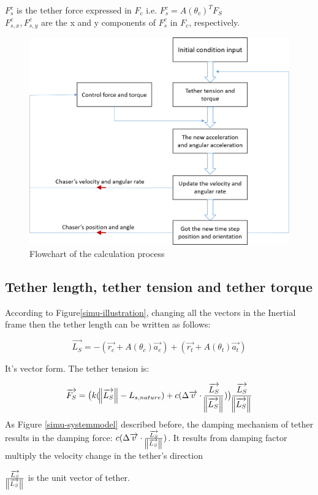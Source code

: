 \quad $F_{s}^c$ is the tether force expressed in $F_c$ i.e. $F_{s}^c = A(\theta_c)^TF_S$\\
\quad $F_{s,x}^c,F_{s,y}^c$ are the x and y components of $F_{s}^c$ in $F_c$, respectively.

\begin{figure}
\centering
\includegraphics[width=\textwidth]{fig/simulation/flowchart}
\caption{Flowchart of the calculation process}
\label{simu-flowchart}
\end{figure}

\subsection{Tether length, tether tension and tether torque}

According to Figure\ref{simu-illustration}, changing all the vectors in the Inertial frame then the tether length can be written as follows:

$$ \overrightarrow{L_S} = -(\overrightarrow{r_c} + A(\theta_c)\overrightarrow{a_c})+(\overrightarrow{r_t} + A(\theta_t)\overrightarrow{a_t})$$
 
It's vector form. The tether tension is: 

$$ \overrightarrow{F_S} = \bigl(k(\norm{\overrightarrow{L_S}} - L_{s,nature}) + c(\Delta\overrightarrow{v} \cdot 
	\frac{\overrightarrow{L_S}}{\norm{\overrightarrow{L_S}}})
	\bigr)
	\frac{\overrightarrow{L_S}}{
	\norm{
	\overrightarrow{L_S}
	}
	}
$$
As Figure \ref{simu-systemmodel} described before, the damping mechanism of tether results in the damping force: $c(\Delta\overrightarrow{v}\cdot \frac{\overrightarrow{L_S}}{\norm{\overrightarrow{L_S}}}) $. It results from damping factor multiply the velocity change in the tether's direction

$\frac{\overrightarrow{L_S}}{\norm{\overrightarrow{L_S}}}$ is the unit vector of tether.


   
\newpage
